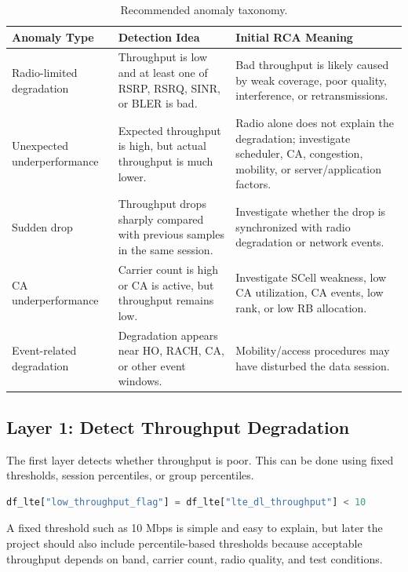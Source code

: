 \documentclass[12pt,a4paper]{article}
\begin{document}
\begin{table}[H]
\centering
\begin{tabularx}{\textwidth}{@{}L{0.24\textwidth}YY@{}}
\toprule
\textbf{Anomaly Type} & \textbf{Detection Idea} & \textbf{Initial RCA Meaning} \\
\midrule
Radio-limited degradation & Throughput is low and at least one of RSRP, RSRQ, SINR, or BLER is bad. & Bad throughput is likely caused by weak coverage, poor quality, interference, or retransmissions. \\
Unexpected underperformance & Expected throughput is high, but actual throughput is much lower. & Radio alone does not explain the degradation; investigate scheduler, CA, congestion, mobility, or server/application factors. \\
Sudden drop & Throughput drops sharply compared with previous samples in the same session. & Investigate whether the drop is synchronized with radio degradation or network events. \\
CA underperformance & Carrier count is high or CA is active, but throughput remains low. & Investigate SCell weakness, low CA utilization, CA events, low rank, or low RB allocation. \\
Event-related degradation & Degradation appears near HO, RACH, CA, or other event windows. & Mobility/access procedures may have disturbed the data session. \\
\bottomrule
\end{tabularx}
\caption{Recommended anomaly taxonomy.}
\end{table}

\subsection{Layer 1: Detect Throughput Degradation}

The first layer detects whether throughput is poor. This can be done using fixed thresholds, session percentiles, or group percentiles.

\begin{lstlisting}[language=Python]
df_lte["low_throughput_flag"] = df_lte["lte_dl_throughput"] < 10
\end{lstlisting}

A fixed threshold such as 10 Mbps is simple and easy to explain, but later the project should also include percentile-based thresholds because acceptable throughput depends on band, carrier count, radio quality, and test conditions.
\end{document}
